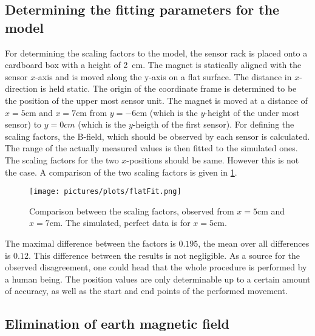 \subsection{Determining the fitting parameters for the model} \label{subsec:resModelFit}

For determining the scaling factors to the model, the sensor rack is placed onto a cardboard box with a height of \SI{2}{\cm}. The magnet is statically aligned with the sensor $ x $-axis and is moved along the y-axis on a flat surface. The distance in $ x $-direction is held static. The origin of the coordinate frame is determined to be the position of the upper most sensor unit. The magnet is moved at a distance of $ x=5\si{\cm} $ and $ x=7\si{\cm} $ from $ y=-6\si{\cm} $ (which is the $ y $-height of the under most sensor) to $ y=0\si{cm} $ (which is the $ y $-heigth of the first sensor). For defining the scaling factors, the B-field, which should be observed by each sensor is calculated. The range of the actually measured values is then fitted to the simulated ones. The scaling factors for the two $ x $-positions should be same. However this is not the case. A comparison of the two scaling factors is given in \ref{fig:flatFit}.

\begin{figure}[h]
\texttt{[image: pictures/plots/flatFit.png]}
\caption{Comparison between the scaling factors, observed from $ x=5\si{\cm} $ and $ x=7\si{\cm} $. The simulated, perfect data is for $ x=5\si{\cm} $.}
\label{fig:flatFit}
\end{figure}

The maximal difference between the factors is $ 0.195 $, the mean over all differences is $ 0.12 $. This difference between the results is not negligible. As a source for the observed disagreement, one could head that the whole procedure is performed by a human being. The position values are only determinable up to a certain amount of accuracy, as well as the start and end points of the performed movement.


\subsection{Elimination of earth magnetic field} \label{subsec:resEarthEli}

